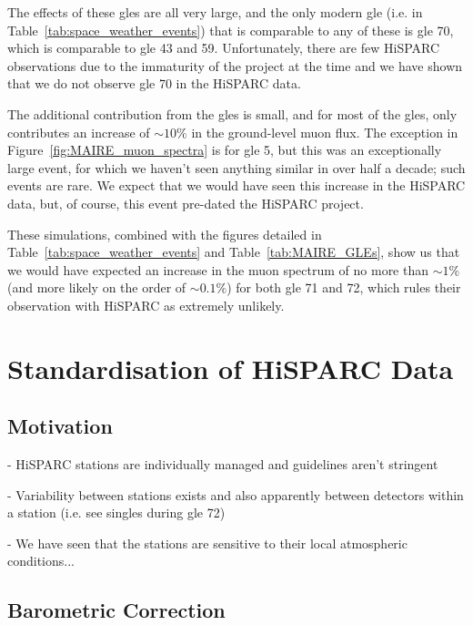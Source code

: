 The effects of these \glspl{gle} are all very large, and the only modern \gls{gle} (i.e. in Table~\ref{tab:space_weather_events}) that is comparable to any of these is \gls{gle} 70, which is comparable to \gls{gle} 43 and 59. Unfortunately, there are few HiSPARC observations due to the immaturity of the project at the time and we have shown that we do not observe \gls{gle} 70 in the HiSPARC data.

The additional contribution from the \glspl{gle} is small, and for most of the \glspl{gle}, only contributes an increase of $\sim 10 \%$ in the ground-level muon flux. The exception in Figure~\ref{fig:MAIRE_muon_spectra} is for \gls{gle} 5, but this was an exceptionally large event, for which we haven't seen anything similar in over half a decade; such events are rare. We expect that we would have seen this increase in the HiSPARC data, but, of course, this event pre-dated the HiSPARC project.

These simulations, combined with the figures detailed in Table~\ref{tab:space_weather_events} and Table~\ref{tab:MAIRE_GLEs}, show us that we would have expected an increase in the muon spectrum of no more than $\sim 1\%$ (and more likely on the order of $\sim 0.1\%$) for both \gls{gle} 71 and 72, which rules their observation with HiSPARC as extremely unlikely.




\section{Standardisation of HiSPARC Data}\label{sec:HS_standardisation}

\subsection{Motivation}
- HiSPARC stations are individually managed and guidelines aren't stringent

- Variability between stations exists and also apparently between detectors within a station (i.e. see singles during \gls{gle} 72)

- We have seen that the stations are sensitive to their local atmospheric conditions...

\subsection{Barometric Correction}\label{sec:HS_P_corr}

